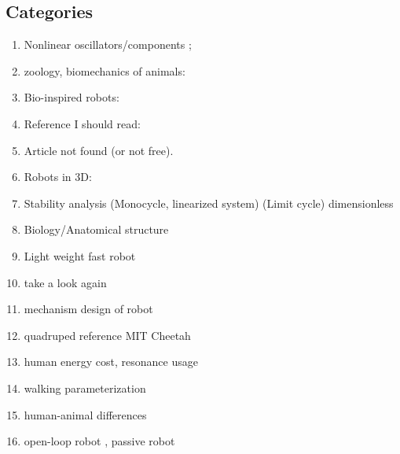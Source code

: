 \documentclass{article}
\begin{document}
\subsection{Categories}

\begin{enumerate}
\item Nonlinear oscillators/components \cite{Akinfiev1999,Anand1966,Babitsky1996,Buchli2006,Chatterjee2012, Karssen2011, Plooij2011};
\item zoology, biomechanics of animals:
\cite{Abourachid2001,Abourachid2011,Alexander1979,Alexander1985,Daley2007}
\item Bio-inspired robots: \cite{Ananthanarayanan2012,Lock2014}
\item Reference I should read: \cite{Cham2002,Daley2006,Kagawa2010,Karssen2011}
\item Article not found (or not free)\cite{Alexander1979}.
\item Robots in 3D: \cite{Coleman1997}
\item Stability analysis (Monocycle, linearized system) \cite{Coleman2010} (Limit cycle) \cite{Cham2002, Kagawa2010} dimensionless \cite{Riese2012}
\item Biology/Anatomical structure \cite{El-Mahdy2010,Gangl2004}
\item Light weight fast robot \cite{Ethington2013,Iida2012}
\item take a look again \cite{Gatesy1991}
\item mechanism design of robot \cite{Grimmer2011}
\item quadruped reference \cite{Hackert2001} MIT Cheetah\cite{Park2012}
\item human energy cost, resonance usage \cite{Holt1991,Arnall2012, Park2013, Racic2009}
\item walking parameterization \cite{Lee2008,Gatesy1991,Weems2006}
\item human-animal differences \cite{Daley2006}
\item open-loop robot \cite{Mombaur2005}, passive robot \cite{Owaki2011, Owaki2010, Owaki2009}
\end{enumerate}
\end{document}
